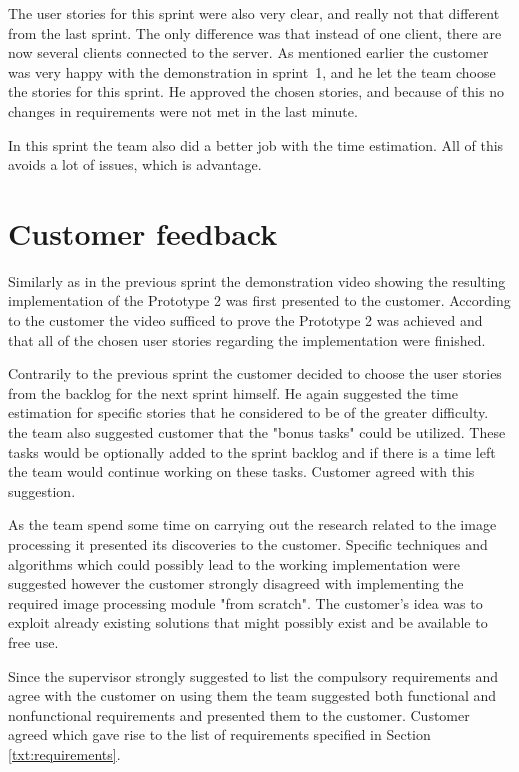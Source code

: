 The user stories for this sprint were also very clear, and really not that different from the last sprint. 
The only difference was that instead of one client, there are now several clients connected to the server. 
As mentioned earlier the customer was very happy with the demonstration in sprint~1, and he let the team choose the stories for this sprint. 
He approved the chosen stories, and because of this no changes in requirements were not met in the last minute.
 
In this sprint the team also did a better job with the time estimation. 
All of this avoids a lot of issues, which is advantage. 
  
\section{Customer feedback}
Similarly as in the previous sprint the demonstration video showing the resulting implementation of the Prototype 2 was first presented to the customer. According to the customer the video sufficed to prove the Prototype 2 was achieved and that all of the chosen user stories regarding the implementation were finished.

Contrarily to the previous sprint the customer decided to choose the user stories from the backlog for the next sprint himself. He again suggested the time estimation for specific stories that he considered to be of the greater difficulty. the team also suggested customer that the "bonus tasks" could be utilized. These tasks would be optionally added to the sprint backlog and if there is a time left the team would continue working on these tasks. Customer agreed with this suggestion.

As the team spend some time on carrying out the research related to the image processing it presented its discoveries to the customer. Specific techniques and algorithms which could possibly lead to the working implementation were suggested however the customer strongly disagreed with implementing the required image processing module "from scratch". The customer's idea was to exploit already existing solutions that might possibly exist and be available to free use.

Since the supervisor strongly suggested to list the compulsory requirements and agree with the customer on using them the team suggested both functional and nonfunctional requirements and presented them to the customer. Customer agreed which gave rise to the list of requirements specified in Section \ref{txt:requirements}.

